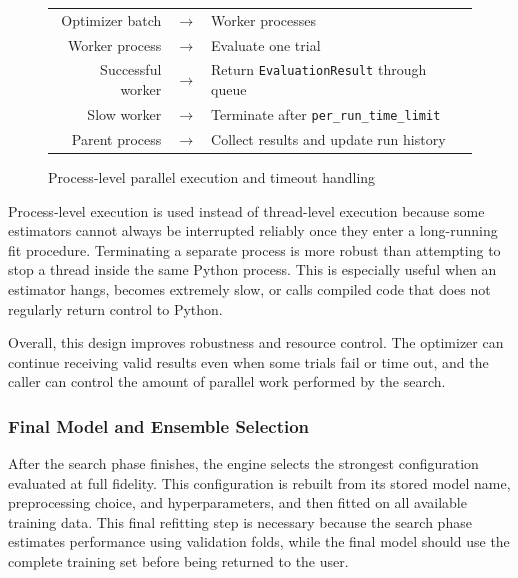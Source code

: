 \documentclass[12pt,a4paper]{report}
\begin{document}
\begin{figure}[H]
\centering
\renewcommand{\arraystretch}{1.25}
\begin{tabular}{rcl}
Optimizer batch
& \(\longrightarrow\) &
Worker processes \\

Worker process
& \(\longrightarrow\) &
Evaluate one trial \\

Successful worker
& \(\longrightarrow\) &
Return \texttt{EvaluationResult} through queue \\

Slow worker
& \(\longrightarrow\) &
Terminate after \texttt{per\_run\_time\_limit} \\

Parent process
& \(\longrightarrow\) &
Collect results and update run history \\
\end{tabular}
\caption{Process-level parallel execution and timeout handling}
\label{fig:gp-automl-parallel-timeout-control}
\end{figure}

\noindent Process-level execution is used instead of thread-level execution because some
estimators cannot always be interrupted reliably once they enter a long-running
fit procedure. Terminating a separate process is more robust than attempting to
stop a thread inside the same Python process. This is especially useful when an
estimator hangs, becomes extremely slow, or calls compiled code that does not
regularly return control to Python.

\noindent Overall, this design improves robustness and resource control. The optimizer can
continue receiving valid results even when some trials fail or time out, and the
caller can control the amount of parallel work performed by the search.


\subsubsection{Final Model and Ensemble Selection}

After the search phase finishes, the engine selects the strongest configuration
evaluated at full fidelity. This configuration is rebuilt from its stored model
name, preprocessing choice, and hyperparameters, and then fitted on all
available training data. This final refitting step is necessary because the
search phase estimates performance using validation folds, while the final model
should use the complete training set before being returned to the user.
\end{document}
